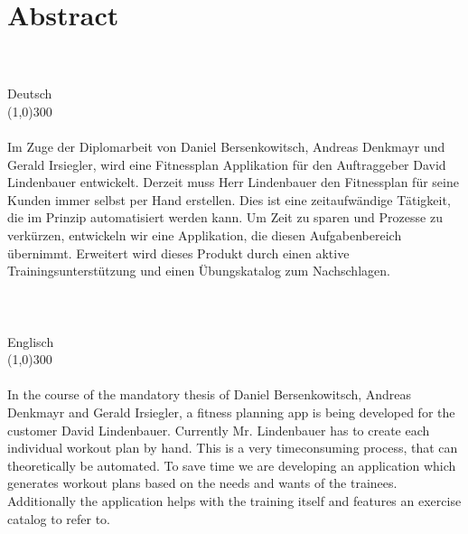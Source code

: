 \documentclass[FIPLY_base.tex]{subfiles}
\begin{document}
	\section{Abstract}
	\ \\
	\ \\
	{\LARGE Deutsch}
	\ \\
	\line(1,0){300}
	\ \\
	\ \\
	Im Zuge der Diplomarbeit von Daniel Bersenkowitsch, Andreas Denkmayr und Gerald Irsiegler, wird eine Fitnessplan Applikation für den Auftraggeber David Lindenbauer entwickelt. Derzeit muss Herr Lindenbauer den Fitnessplan für seine Kunden immer selbst per Hand erstellen. Dies ist eine zeitaufwändige Tätigkeit, die im Prinzip automatisiert werden kann. Um Zeit zu sparen und Prozesse zu verkürzen, entwickeln wir eine Applikation, die diesen Aufgabenbereich übernimmt. Erweitert wird dieses Produkt durch einen aktive Trainingsunterstützung und einen Übungskatalog zum Nachschlagen. 
	\ \\
	\ \\
	\ \\
	\ \\
	{\LARGE Englisch}
	\ \\
	\line(1,0){300}
	\ \\ 
	\ \\
	In the course of the mandatory thesis of Daniel Bersenkowitsch, Andreas Denkmayr and Gerald Irsiegler, a fitness planning app is being developed for the customer David Lindenbauer. Currently Mr. Lindenbauer has to create each individual workout plan by hand. This is a very timeconsuming process, that can theoretically be automated. To save time we are developing an application which generates workout plans based on the needs and wants of the trainees. Additionally the application helps with the training itself and features an exercise catalog to refer to.
\end{document}
